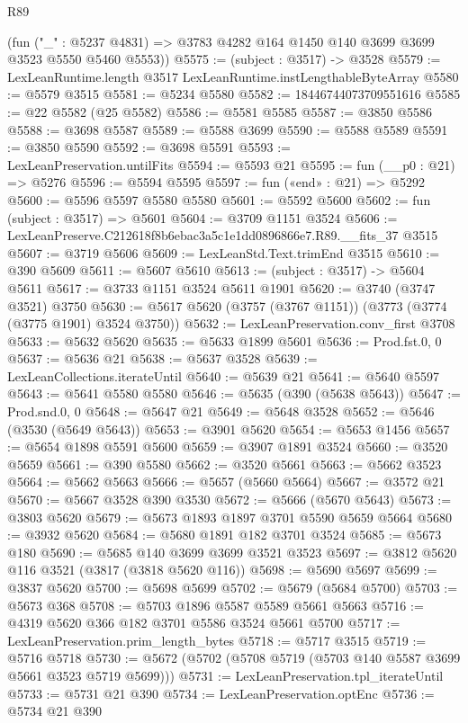 \begin{lexlean}{R89}
\begin{coremodule}
      (fun ("_" : @5237 @4831) => @3783 @4282 @164 @1450 @140 @3699 @3699 @3523 @5550 @5460 @5553))
@5575 := (subject : @3517) -> @3528
@5579 := LexLeanRuntime.length @3517 LexLeanRuntime.instLengthableByteArray
@5580 := @5579 @3515
@5581 := @5234 @5580
@5582 := 18446744073709551616
@5585 := @22 @5582 (@25 @5582)
@5586 := @5581 @5585
@5587 := @3850 @5586
@5588 := @3698 @5587
@5589 := @5588 @3699
@5590 := @5588 @5589
@5591 := @3850 @5590
@5592 := @3698 @5591
@5593 := LexLeanPreservation.untilFits
@5594 := @5593 @21
@5595 := fun (__p0 : @21) => @5276
@5596 := @5594 @5595
@5597 := fun («end» : @21) => @5292
@5600 := @5596 @5597 @5580 @5580
@5601 := @5592 @5600
@5602 := fun (subject : @3517) => @5601
@5604 := @3709 @1151 @3524
@5606 := LexLeanPreserve.C212618f8b6ebac3a5c1e1dd0896866e7.R89.__fits_37 @3515
@5607 := @3719 @5606
@5609 := LexLeanStd.Text.trimEnd @3515
@5610 := @390 @5609
@5611 := @5607 @5610
@5613 := (subject : @3517) -> @5604 @5611
@5617 := @3733 @1151 @3524 @5611 @1901
@5620 := @3740 (@3747 @3521) @3750
@5630 := @5617 @5620 (@3757 (@3767 @1151)) (@3773 (@3774 (@3775 @1901) @3524 @3750))
@5632 := LexLeanPreservation.conv_first @3708
@5633 := @5632 @5620
@5635 := @5633 @1899 @5601
@5636 := Prod.fst.{0, 0}
@5637 := @5636 @21
@5638 := @5637 @3528
@5639 := LexLeanCollections.iterateUntil
@5640 := @5639 @21
@5641 := @5640 @5597
@5643 := @5641 @5580 @5580
@5646 := @5635 (@390 (@5638 @5643))
@5647 := Prod.snd.{0, 0}
@5648 := @5647 @21
@5649 := @5648 @3528
@5652 := @5646 (@3530 (@5649 @5643))
@5653 := @3901 @5620
@5654 := @5653 @1456
@5657 := @5654 @1898 @5591 @5600
@5659 := @3907 @1891 @3524
@5660 := @3520 @5659
@5661 := @390 @5580
@5662 := @3520 @5661
@5663 := @5662 @3523
@5664 := @5662 @5663
@5666 := @5657 (@5660 @5664)
@5667 := @3572 @21
@5670 := @5667 @3528 @390 @3530
@5672 := @5666 (@5670 @5643)
@5673 := @3803 @5620
@5679 := @5673 @1893 @1897 @3701 @5590 @5659 @5664
@5680 := @3932 @5620
@5684 := @5680 @1891 @182 @3701 @3524
@5685 := @5673 @180
@5690 := @5685 @140 @3699 @3699 @3521 @3523
@5697 := @3812 @5620 @116 @3521 (@3817 (@3818 @5620 @116))
@5698 := @5690 @5697
@5699 := @3837 @5620
@5700 := @5698 @5699
@5702 := @5679 (@5684 @5700)
@5703 := @5673 @368
@5708 := @5703 @1896 @5587 @5589 @5661 @5663
@5716 := @4319 @5620 @366 @182 @3701 @5586 @3524 @5661 @5700
@5717 := LexLeanPreservation.prim_length_bytes
@5718 := @5717 @3515
@5719 := @5716 @5718
@5730 := @5672 (@5702 (@5708 @5719 (@5703 @140 @5587 @3699 @5661 @3523 @5719 @5699)))
@5731 := LexLeanPreservation.tpl_iterateUntil
@5733 := @5731 @21 @390
@5734 := LexLeanPreservation.optEnc
@5736 := @5734 @21 @390

\end{coremodule}
\end{lexlean}

